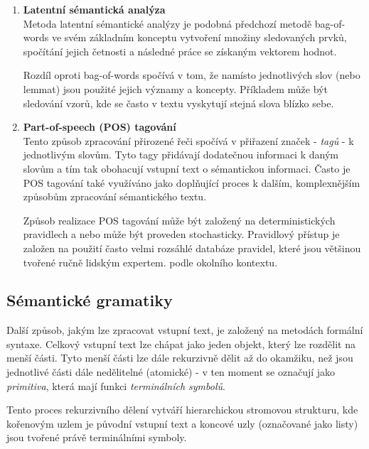 \begin{enumerate}
	\item \textbf{Latentní sémantická analýza}\\
	      Metoda latentní sémantické analýzy je podobná předchozí metodě bag-of-words ve svém základním konceptu vytvoření množiny
	      sledovaných prvků, spočítání jejich četnosti a následné práce se získaným vektorem hodnot.

	      Rozdíl oproti bag-of-words spočívá v tom, že namísto jednotlivých slov (nebo lemmat) jsou použité jejich významy a koncepty.
	      Příkladem může být sledování vzorů, kde se často v textu vyskytují stejná slova blízko sebe.~\cite{the_conversational_interface}

	      \newpage
	\item \textbf{Part-of-speech (POS) tagování}\\
	      Tento způsob zpracování přirozené řeči spočívá v přiřazení značek - \emph{tagů} - k jednotlivým slovům.
	      Tyto tagy přidávají dodatečnou informaci k daným slovům a tím tak obohacují vstupní text o sémantickou informaci.
	      Často je POS tagování také využíváno jako doplňující proces k dalším, komplexnějším způsobům zpracování sémantického textu.~\cite{the_conversational_interface}

	      Způsob realizace POS tagování může být založený na deterministických pravidlech a nebo může být proveden stochasticky.
	      Pravidlový přístup je založen na použití často velmi rozsáhlé databáze pravidel, které jsou většinou tvořené ručně lidským expertem.
	      podle okolního kontextu.~\cite{the_conversational_interface}
\end{enumerate}

\subsection{Sémantické gramatiky}\label{subsubsec:grammars}
Další způsob, jakým lze zpracovat vstupní text, je založený na metodách formální syntaxe.
Celkový vstupní text lze chápat jako jeden objekt, který lze rozdělit na menší části.
Tyto menší části lze dále rekurzivně dělit až do okamžiku, než jsou jednotlivé části dále nedělitelné (atomické) - v ten moment se označují jako \emph{primitiva},
která mají funkci \emph{terminálních symbolů}.~\cite{PsutkaJ_2006_Mluvimes}

Tento proces rekurzivního dělení vytváří hierarchickou stromovou strukturu, kde kořenovým uzlem je původní vstupní text a
koncové uzly (označované jako listy) jsou tvořené právě terminálními symboly.~\cite{PsutkaJ_2006_Mluvimes}

